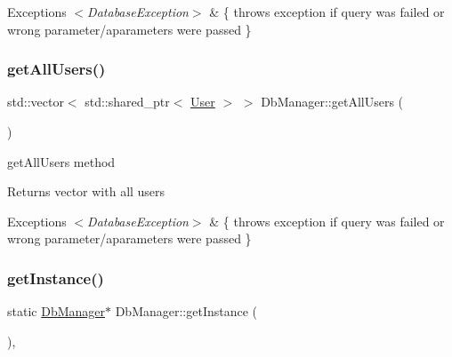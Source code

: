 \begin{DoxyExceptions}{Exceptions}
{\em $<$\+Database\+Exception$>$} & \{ throws exception if query was failed or wrong parameter/aparameters were passed \} \\
\hline
\end{DoxyExceptions}
\mbox{\label{class_db_manager_a44c0415410d7bd27c7b0f1c0545b7a9c}} 
\subsubsection{\texorpdfstring{get\+All\+Users()}{getAllUsers()}}
{\footnotesize\ttfamily std\+::vector$<$ std\+::shared\+\_\+ptr$<$ \hyperlink{class_user}{User} $>$ $>$ Db\+Manager\+::get\+All\+Users (\begin{DoxyParamCaption}{ }\end{DoxyParamCaption})}



get\+All\+Users method 

\begin{DoxyReturn}{Returns}
vector with all users 
\end{DoxyReturn}

\begin{DoxyExceptions}{Exceptions}
{\em $<$\+Database\+Exception$>$} & \{ throws exception if query was failed or wrong parameter/aparameters were passed \} \\
\hline
\end{DoxyExceptions}
\mbox{\label{class_db_manager_ab7a78daf74a668a26c4403a8c43ede3f}} 
\subsubsection{\texorpdfstring{get\+Instance()}{getInstance()}}
{\footnotesize\ttfamily static \hyperlink{class_db_manager}{Db\+Manager}$\ast$ Db\+Manager\+::get\+Instance (\begin{DoxyParamCaption}{ }\end{DoxyParamCaption})\hspace{0.3cm}{\ttfamily [inline]}, {\ttfamily [static]}}



